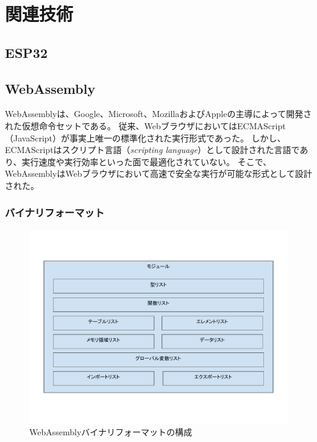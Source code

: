 \chapter{関連技術}
\label{chap:related_works}

\section{ESP32}

\section{WebAssembly}

WebAssemblyは、Google、Microsoft、MozillaおよびAppleの主導によって開発された仮想命令セットである\cite{webassembly}。
従来、WebブラウザにおいてはECMAScript（JavaScript）が事実上唯一の標準化された実行形式であった。
しかし、ECMAScriptはスクリプト言語（{\it scripting language}）として設計された言語であり\cite{ecma2018}、実行速度や実行効率といった面で最適化されていない。
そこで、WebAssemblyはWebブラウザにおいて高速で安全な実行が可能な形式として設計された。

\subsection{バイナリフォーマット}

\begin{figure}[htbp]
  \caption{WebAssemblyバイナリフォーマットの構成}
  \label{fig:wasm_module}
  \begin{center}
    \includegraphics[bb=0 0 800 600,width=12cm]{img/wasm_module.pdf}
  \end{center}
\end{figure}

